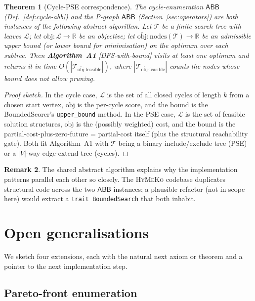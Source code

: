 \documentclass[11pt,a4paper]{article}
\theoremstyle{plain}
\newtheorem{theorem}{Theorem}
\theoremstyle{definition}
\newtheorem{remark}[theorem]{Remark}
\newcommand{\HyMeKo}{\textsc{HyMeKo}}
\newcommand{\code}[1]{\texttt{\small #1}}
\newcommand{\abb}{\textsf{ABB}}
\newcommand{\Real}{\mathbb{R}}
\begin{document}
\begin{theorem}[Cycle-PSE correspondence]
\label{thm:cycle-pse}
The cycle-enumeration $\abb$ (Def.~\ref{def:cycle-abb}) and the
P-graph $\abb$ (Section~\ref{sec:operators}) are both instances of
the following abstract algorithm. Let
$\mathcal{T}$ be a finite search tree with leaves
$\mathcal{L}$; let $\mathrm{obj} : \mathcal{L} \to \Real$ be an
objective; let
$\overline{\mathrm{obj}} : \mathrm{nodes}(\mathcal{T}) \to \Real$
be an admissible upper bound (or lower bound for minimisation) on
the optimum over each subtree. Then \textbf{Algorithm~A1}
\textsf{[DFS-with-bound]}
visits at least one optimum and returns it in time
$O(|\mathcal{T}_{\overline{\mathrm{obj}}\text{-feasible}}|)$, where
$|\mathcal{T}_{\overline{\mathrm{obj}}\text{-feasible}}|$ counts the
nodes whose bound does not allow pruning.
\end{theorem}

\begin{proof}[Proof sketch]
In the cycle case, $\mathcal{L}$ is the set of all closed cycles
of length $k$ from a chosen start vertex, $\mathrm{obj}$ is the
per-cycle score, and the bound is the BoundedScorer's
\code{upper\_bound} method.
In the PSE case, $\mathcal{L}$ is the set of feasible solution
structures, $\mathrm{obj}$ is the (possibly weighted) cost, and the
bound is the partial-cost-plus-zero-future = partial-cost itself
(plus the structural reachability gate). Both fit Algorithm~A1
with $\mathcal{T}$ being a binary include/exclude tree (PSE) or a
$|V|$-way edge-extend tree (cycles).
\end{proof}

\begin{remark}
The shared abstract algorithm explains why the implementation
patterns parallel each other so closely. The \HyMeKo{} codebase
duplicates structural code across the two $\abb$ instances; a
plausible refactor (not in scope here) would extract a
\code{trait BoundedSearch} that both inhabit.
\end{remark}

\section{Open generalisations}
\label{sec:open}

We sketch four extensions, each with the natural next axiom or
theorem and a pointer to the next implementation step.

\subsection{Pareto-front enumeration}
\label{ssec:pareto}
\end{document}
